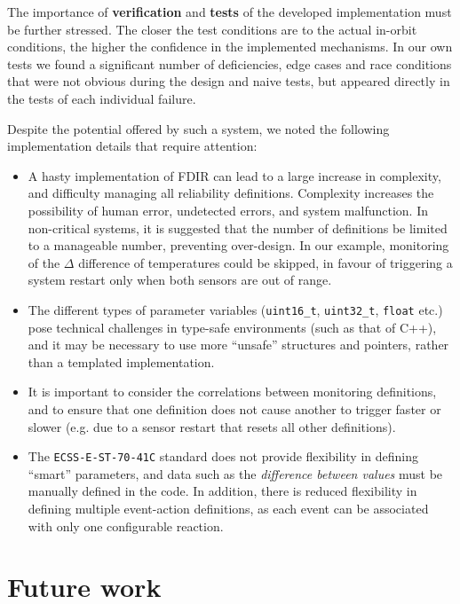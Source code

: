 \documentclass[a4paper,nobib]{tufte-book}
\begin{document}
\begin{fullwidth}
The importance of \textbf{verification} and \textbf{tests} of the developed implementation must be further stressed. The closer the test conditions are to the actual in-orbit conditions, the higher the confidence in the implemented mechanisms. In our own tests we found a significant number of deficiencies, edge cases and race conditions that were not obvious during the design and naive tests, but appeared directly in the tests of each individual failure.

Despite the potential offered by such a system, we noted the following implementation details that require attention:
\begin{itemize}
	\item A hasty implementation of \acs{FDIR} can lead to a large increase in complexity, and difficulty managing all reliability definitions. Complexity increases the possibility of human error, undetected errors, and system malfunction. In non-critical systems, it is suggested that the number of definitions be limited to a manageable number, preventing over-design. In our example, monitoring of the \(\Delta\) difference of temperatures could be skipped, in favour of triggering a system restart only when both sensors are out of range.
	\item The different types of parameter variables (\texttt{uint16_t}, \texttt{uint32_t}, \texttt{float} etc.) pose technical challenges in type-safe environments (such as that of C++), and it may be necessary to use more ``unsafe'' structures and pointers, rather than a templated implementation.
	\item It is important to consider the correlations between monitoring definitions, and to ensure that one definition does not cause another to trigger faster or slower (e.g. due to a sensor restart that resets all other definitions).
	\item The \texttt{ECSS-E-ST-70-41C} standard does not provide flexibility in defining ``smart'' parameters, and data such as the \emph{difference between values} must be manually defined in the code. In addition, there is reduced flexibility in defining multiple event-action definitions, as each event can be associated with only one configurable reaction.
\end{itemize}

\section{Future work}


\end{fullwidth}
\end{document}
